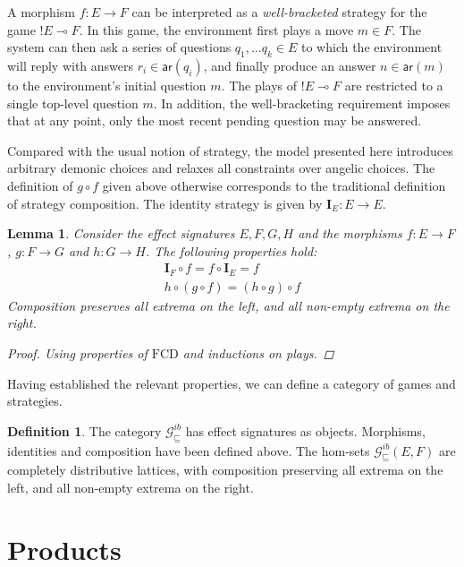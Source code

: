 \documentclass[11pt,oneside]{book}
\newtheorem{lemma}[theorem]{Lemma}
\theoremstyle{definition}
\newtheorem{definition}[theorem]{Definition}
\newcommand{\gcat}{\mathcal{G}_{\sqsubseteq}}
\newcommand{\kw}[1]{\ensuremath{ \mathsf{#1} }}
\begin{document}
A morphism $f : E \rightarrow F$
can be interpreted as a \emph{well-bracketed} strategy for the game
${!E} \multimap F$.
In this game,
the environment first plays a move $m \in F$.
The system can then ask a series of questions
$q_1, \ldots q_k \in E$
to which the environment will reply with
answers $r_i \in \kw{ar}(q_i)$,
and finally produce an answer $n \in \kw{ar}(m)$
to the environment's initial question $m$.
The plays of ${!E} \multimap F$
are restricted to a single top-level question $m$.
In addition, the well-bracketing requirement
imposes that at any point,
only the most recent pending question
may be answered.

Compared with the usual notion of strategy,
the model presented here introduces arbitrary demonic choices and
relaxes all constraints over angelic choices.
The definition of $g \circ f$ given above
otherwise corresponds to the traditional
definition of strategy composition.
The identity strategy is given by $\mathbf{I}_E : E \rightarrow E$.

\begin{lemma}
Consider the effect signatures $E, F, G, H$ and
the morphisms
$f : E \rightarrow F$,
$g : F \rightarrow G$ and
$h : G \rightarrow H$.
The following properties hold:
\begin{gather*}
  \mathbf{I}_F \circ f = f \circ \mathbf{I}_E = f \\
  h \circ (g \circ f) = (h \circ g) \circ f
\end{gather*}
Composition preserves all extrema on the left,
and all non-empty extrema on the right.
\begin{proof}
Using properties of $\mathrm{FCD}$
and inductions on plays.
\end{proof}
\end{lemma}

Having established the relevant properties,
we can define a category of games and strategies.

\begin{definition}
The category $\gcat^{ib}$ has effect signatures as objects.
Morphisms, identities and composition have been defined above.
The hom-sets $\gcat^{ib}(E, F)$
are completely distributive lattices,
with composition preserving all extrema on the left,
and all non-empty extrema on the right.
\end{definition}


\section{Products} %
\end{document}

